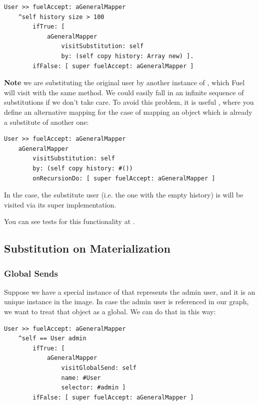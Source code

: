 \documentclass[a4paper,10pt,twoside]{book}
\begin{document}
\begin{lstlisting}
User >> fuelAccept: aGeneralMapper
    ^self history size > 100 
        ifTrue: [ 
            aGeneralMapper 
                visitSubstitution: self 
                by: (self copy history: Array new) ].
        ifFalse: [ super fuelAccept: aGeneralMapper ]
\end{lstlisting}

\textbf{Note} we are substituting the original user by another instance of , which Fuel will visit with the same  method. We could easily fall in an infinite sequence of substitutions if we don't take care. To avoid this problem, it is useful , where you define an alternative mapping for the case of mapping an object which is already a substitute of another one:

\begin{lstlisting}
User >> fuelAccept: aGeneralMapper
    aGeneralMapper 
        visitSubstitution: self 
        by: (self copy history: #())
        onRecursionDo: [ super fuelAccept: aGeneralMapper ]
\end{lstlisting}

In the case, the substitute user (i.e. the one with the empty history) is will be visited via its super implementation.

You can see tests for this functionality at .

\subsection{Substitution on Materialization}

\subsubsection{Global Sends}

Suppose we have a special instance of  that represents the admin user, and it is an unique instance in the image. In case the admin user is referenced in our graph, we want to treat that object as a global. We can do that in this way:

\begin{lstlisting}
User >> fuelAccept: aGeneralMapper
    ^self == User admin
        ifTrue: [ 
            aGeneralMapper 
                visitGlobalSend: self 
                name: #User 
                selector: #admin ]
        ifFalse: [ super fuelAccept: aGeneralMapper ]
\end{lstlisting}
\end{document}
